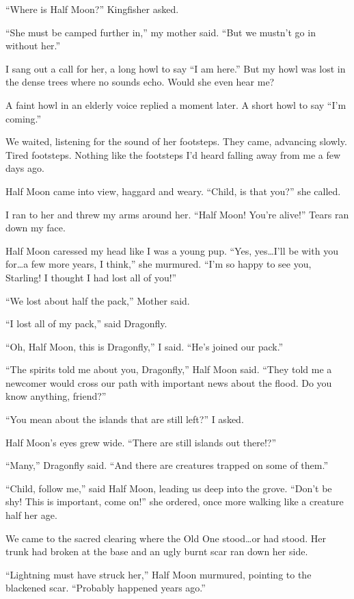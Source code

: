 ``Where is Half Moon?'' Kingfisher asked.

``She must be camped further in,'' my mother said. ``But we mustn't go in without her.''

I sang out a call for her, a long howl to say ``I am here.'' But my howl was lost in the dense trees where no sounds echo. Would she even hear me?

A faint howl in an elderly voice replied a moment later. A short howl to say ``I'm coming.''

We waited, listening for the sound of her footsteps. They came, advancing slowly. Tired footsteps. Nothing like the footsteps I'd heard falling away from me a few days ago.

Half Moon came into view, haggard and weary. ``Child, is that you?'' she called.

I ran to her and threw my arms around her. ``Half Moon! You're alive!'' Tears ran down my face.

Half Moon caressed my head like I was a young pup. ``Yes, yes\ldots{}I'll be with you for\ldots{}a few more years, I think,'' she murmured. ``I'm so happy to see you, Starling! I thought I had lost all of you!''

``We lost about half the pack,'' Mother said.

``I lost all of my pack,'' said Dragonfly.

``Oh, Half Moon, this is Dragonfly,'' I said. ``He's joined our pack.''

``The spirits told me about you, Dragonfly,'' Half Moon said. ``They told me a newcomer would cross our path with important news about the flood. Do you know anything, friend?''

``You mean about the islands that are still left?'' I asked.

Half Moon's eyes grew wide. ``There are still islands out there!?''

``Many,'' Dragonfly said. ``And there are creatures trapped on some of them.''

``Child, follow me,'' said Half Moon, leading us deep into the grove. ``Don't be shy! This is important, come on!'' she ordered, once more walking like a creature half her age.

We came to the sacred clearing where the Old One stood\ldots{}or had stood. Her trunk had broken at the base and an ugly burnt scar ran down her side.

``Lightning must have struck her,'' Half Moon murmured, pointing to the blackened scar. ``Probably happened years ago.''

